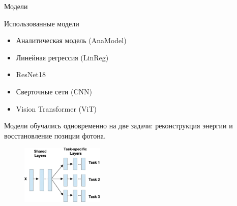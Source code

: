 \documentclass[9pt]{beamer}
\begin{document}
\begin{frame}{Модели}
    \begin{block}{Использованные модели}
        \begin{itemize}
            \item Аналитическая модель (AnaModel)
            \item Линейная регрессия (LinReg)
            \item ResNet18
            \item Сверточные сети (CNN)
            \item Vision Transformer (ViT)
        \end{itemize}
    \end{block}

    \begin{block}{}
        Модели обучались одновременно на две задачи: реконструкция энергии и восстановление позиции фотона.
        \begin{figure}
            \centering
            \includegraphics[width=0.35\textwidth]{images/multitask.png}
        \end{figure}
    \end{block}
\end{frame}
\end{document}
